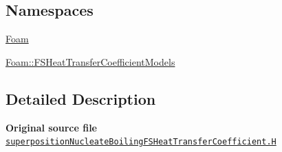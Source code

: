 \subsection*{Namespaces}
\begin{DoxyCompactItemize}
\item 
 \hyperlink{namespaceFoam}{Foam}
\item 
 \hyperlink{namespaceFoam_1_1FSHeatTransferCoefficientModels}{Foam\+::\+F\+S\+Heat\+Transfer\+Coefficient\+Models}
\end{DoxyCompactItemize}


\subsection{Detailed Description}
{\bfseries Original source file} \href{../../../home/carlo/data/GeN-Foam/GeN-Foam_ffn/GeN-Foam/GeN-Foam/classes/thermalHydraulics/src/physicsModels/heatTransferModels/FSHeatTransferCoefficientModels/subModels/superpositionNucleateBoiling/superpositionNucleateBoilingFSHeatTransferCoefficient.H}{\tt superposition\+Nucleate\+Boiling\+F\+S\+Heat\+Transfer\+Coefficient.\+H} 